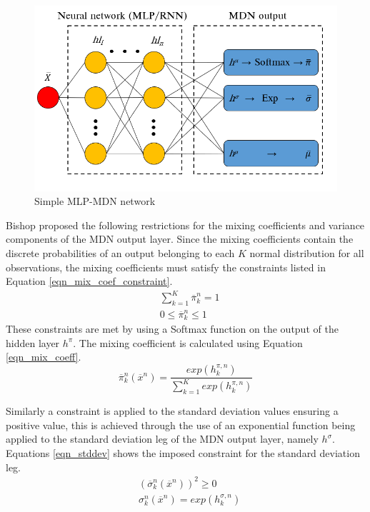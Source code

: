\documentclass[a4paper,fleqn]{cas-sc}
\begin{document}
\begin{figure}[h!]
	\centering
		\includegraphics[scale=0.5]{MDN_SCHEMATIC}
	  \caption{Simple MLP-MDN network}\label{fig_mdn_schematic}
\end{figure}

Bishop \cite{bishop1994} proposed the following restrictions for the mixing coefficients and variance components of the MDN output layer. Since the mixing coefficients contain the discrete probabilities of an output belonging to each $K$ normal distribution for all observations, the mixing coefficients must satisfy the constraints listed in Equation \ref{eqn_mix_coef_constraint}.
\begin{equation}\label{eqn_mix_coef_constraint}
\begin{split}
&\sum_{k=1}^K\overline{\pi}_k^n=1\\
&0\leq\overline{\pi}_k^n\leq1
\end{split}
\end{equation}
These constraints are met by using a Softmax function on the output of the hidden layer $h^{\pi}$. The mixing coefficient is calculated using Equation \ref{eqn_mix_coeff}.
\begin{equation}\label{eqn_mix_coeff}
\overline{\pi}_k^n(\overline{x}^n)=\frac{exp(h_k^{\pi,n})}{\sum_{k=1}^Kexp(h_k^{\pi,n})}
\end{equation}

Similarly a constraint is applied to the standard deviation values ensuring a positive value, this is achieved through the use of an exponential function being applied to the standard deviation leg of the MDN output layer, namely $h^{\sigma}$. Equations \ref{eqn_stddev} shows the imposed constraint for the standard deviation leg.\\
\begin{equation}\label{eqn_stddev}
\begin{split}
&(\overline{\sigma}^n_k(\overline{x}^n))^2\geq 0\\
&\sigma_k^n(\overline{x}^n)=exp(h_k^{\sigma,n})
\end{split}
\end{equation}
\end{document}
